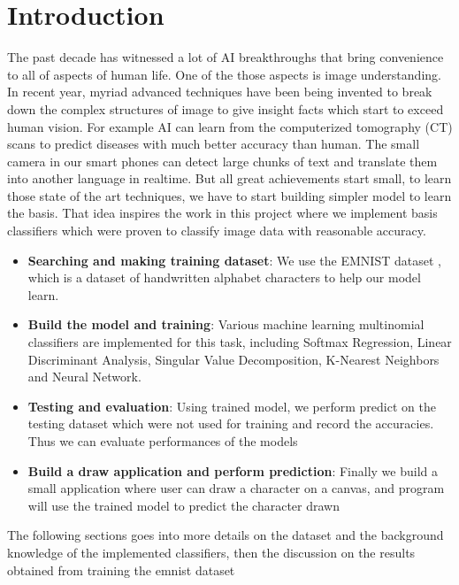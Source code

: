 \documentclass[12,]{article}
\providecommand{\tightlist}{%
  \setlength{\itemsep}{0pt}\setlength{\parskip}{0pt}}
\begin{document}
\hypertarget{introduction}{%
\section{Introduction}\label{introduction}}

The past decade has witnessed a lot of AI breakthroughs that bring
convenience to all of aspects of human life. One of the those aspects is
image understanding. In recent year, myriad advanced techniques have
been being invented to break down the complex structures of image to
give insight facts which start to exceed human vision. For example AI
can learn from the computerized tomography (CT) scans to predict
diseases with much better accuracy than human. The small camera in our
smart phones can detect large chunks of text and translate them into
another language in realtime. But all great achievements start small, to
learn those state of the art techniques, we have to start building
simpler model to learn the basis. That idea inspires the work in this
project where we implement basis classifiers which were proven to
classify image data with reasonable accuracy.

\begin{itemize}
\tightlist
\item
  \textbf{Searching and making training dataset}: We use the EMNIST
  dataset \cite{emnist}, which is a dataset of handwritten alphabet
  characters to help our model learn.
\item
  \textbf{Build the model and training}: Various machine learning
  multinomial classifiers are implemented for this task, including
  Softmax Regression, Linear Discriminant Analysis, Singular Value
  Decomposition, K-Nearest Neighbors and Neural Network.
\item
  \textbf{Testing and evaluation}: Using trained model, we perform
  predict on the testing dataset which were not used for training and
  record the accuracies. Thus we can evaluate performances of the models
\item
  \textbf{Build a draw application and perform prediction}: Finally we
  build a small application where user can draw a character on a canvas,
  and program will use the trained model to predict the character drawn
\end{itemize}

The following sections goes into more details on the dataset and the
background knowledge of the implemented classifiers, then the discussion
on the results obtained from training the emnist dataset
\end{document}
